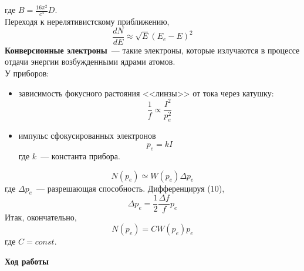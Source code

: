 \documentclass[12pt]{article}
\begin{document}
где $B = \displaystyle \frac{16\pi^2}{c^4}D$.
\\
Переходя к нерелятивистскому приближению,
\begin{equation}
    \label{eq:(9)}
    \frac{dN}{dE}\approx \sqrt{E}(E_e-E)^2
\end{equation}
\textbf{Конверсионные электроны}~--- такие электроны, которые излучаются в
процессе отдачи энергии возбужденными ядрами атомов.
\\
У приборов:
\begin{itemize}
    \item зависимость фокусного растояния <<линзы>> от тока через катушку:
    \begin{equation}
        \label{eq:(10)}
        \frac{1}{f} \propto \frac{I^2}{p^2_e}
    \end{equation}
    \item импульс сфокусированных электронов
    \begin{equation}
        \label{eq:(11)}
        p_e = kI
    \end{equation}
    где $k$~--- константа прибора.
\end{itemize}
    \begin{equation}
        \label{eq:(12)}
        N(p_e) \simeq W(p_e)\Delta p_e
    \end{equation}
    где $\Delta p_e$~--- разрешающая способность. Дифференцируя ($10$),
    \begin{equation}
        \label{eq:(13)}
        \Delta p_e = \frac{1}{2}\frac{\Delta f}{f}p_e
    \end{equation}
    Итак, окончательно,
    \begin{equation}
        \label{eq:(14)}
        N(p_e) = CW(p_e)p_e
    \end{equation}
    где $C= const$.
\newpage
\begin{center}
    \textbf{Ход работы}
\end{center}
\end{document}
